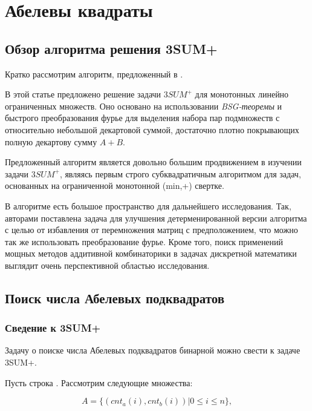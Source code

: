 \section{Абелевы квадраты}

\subsection{Обзор алгоритма решения 3SUM+}

Кратко рассмотрим алгоритм, предложенный в \cite{2}. 

В этой статье предложено решение задачи $3SUM^+$ для монотонных линейно ограниченных множеств. Оно основано на использовании \textit{BSG-теоремы} и быстрого преобразования фурье для выделения набора пар подмножеств с относительно небольшой декартовой суммой, достаточно плотно покрывающих полную декартову сумму $A+B$.

Предложенный алгоритм является довольно большим продвижением в изучении задачи $3SUM^+$, являясь первым строго субквадратичным алгоритмом для задач, основанных на ограниченной монотонной (min,+) свертке.

В алгоритме есть большое пространство для дальнейшего исследования. Так, авторами поставлена задача для улучшения детерменированной версии алгоритма с целью от избавления от перемножения матриц с предположением, что можно так же использовать преобразование фурье. Кроме того, поиск применений мощных методов аддитивной комбинаторики в задачах дискретной математики выглядит очень перспективной областью исследования.

\subsection{Поиск числа Абелевых подквадратов}

\subsubsection{Сведение к 3SUM+}
Задачу о поиске числа Абелевых подквадратов бинарной можно свести к задаче 3SUM+.

Пусть строка . Рассмотрим следующие множества:

\begin{equation}
A = \{ (cnt_a(i), cnt_b(i)) | 0 \le i \le n \},
\end{equation}


